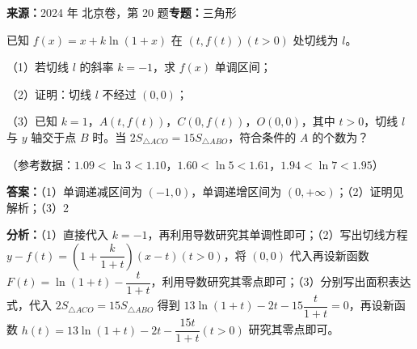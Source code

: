 \begin{question}[points=15]
\textbf{来源：}2024 年 北京卷，第 20 题\quad \textbf{专题：}三角形\par
已知 $f(x)=x+k\ln(1+x)$ 在 $(t,f(t))(t>0)$ 处切线为 $l$。

（1）若切线 $l$ 的斜率 $k=-1$，求 $f(x)$ 单调区间；

（2）证明：切线 $l$ 不经过 $(0,0)$；

（3）已知 $k=1$，$A(t,f(t))$，$C(0,f(t))$，$O(0,0)$，其中 $t>0$，切线 $l$ 与 $y$ 轴交于点 $B$ 时。当 $2S_{\triangle ACO}=15S_{\triangle ABO}$，符合条件的 $A$ 的个数为？

（参考数据：$1.09<\ln3<1.10$，$1.60<\ln5<1.61$，$1.94<\ln7<1.95$）
\begin{solution}
\textbf{答案：}（1）单调递减区间为 $(-1,0)$，单调递增区间为 $(0,+\infty)$；（2）证明见解析；（3）2

\textbf{分析：}（1）直接代入 $k=-1$，再利用导数研究其单调性即可；（2）写出切线方程 $y-f(t)=\left(1+\dfrac{k}{1+t}\right)(x-t)(t>0)$，将 $(0,0)$ 代入再设新函数 $F(t)=\ln(1+t)-\dfrac{t}{1+t}$，利用导数研究其零点即可；（3）分别写出面积表达式，代入 $2S_{\triangle ACO}=15S_{\triangle ABO}$ 得到 $13\ln(1+t)-2t-15\dfrac{t}{1+t}=0$，再设新函数 $h(t)=13\ln(1+t)-2t-\dfrac{15t}{1+t}(t>0)$ 研究其零点即可。


\end{solution}
\end{question}
